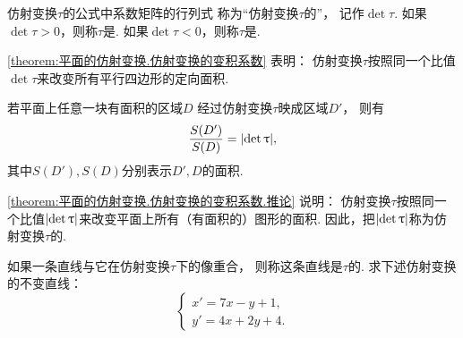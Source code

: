 \begin{definition}
仿射变换\(\tau\)的公式中系数矩阵的行列式
称为“仿射变换\(\tau\)的”，
记作\(\det\tau\).
如果\(\det\tau>0\)，则称\(\tau\)是.
如果\(\det\tau<0\)，则称\(\tau\)是.
\end{definition}

\cref{theorem:平面的仿射变换.仿射变换的变积系数} 表明：
仿射变换\(\tau\)按照同一个比值\(\det\tau\)来改变所有平行四边形的定向面积.

\begin{corollary}\label{theorem:平面的仿射变换.仿射变换的变积系数.推论}
若平面上任意一块有面积的区域\(D\)
经过仿射变换\(\tau\)映成区域\(D'\)，
则有\begin{equation*}
	\frac{S(D')}{S(D)} = \abs{\det\uptau},
\end{equation*}
其中\(S(D'),S(D)\)分别表示\(D',D\)的面积.
\end{corollary}

\cref{theorem:平面的仿射变换.仿射变换的变积系数.推论} 说明：
仿射变换\(\tau\)按照同一个比值\(\abs{\det\uptau}\)来改变平面上所有（有面积的）图形的面积.
因此，把\(\abs{\det\uptau}\)称为仿射变换\(\tau\)的.

\begin{example}
如果一条直线与它在仿射变换\(\tau\)下的像重合，
则称这条直线是\(\tau\)的.
求下述仿射变换的不变直线：\begin{equation*}
	\begin{cases}
		x' = 7x - y + 1, \\
		y' = 4x + 2y + 4.
	\end{cases}
\end{equation*}
\end{example}

